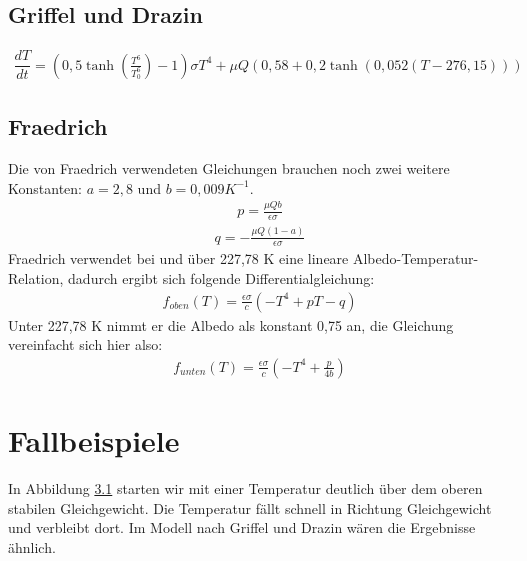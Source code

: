 \documentclass[]{report}
\begin{document}
\section{Griffel und Drazin}
	\begin{align}
		\dfrac{dT}{dt} = (0,5 \tanh\left(\frac{T^6}{T_0^6}\right)-1) \sigma T^4 + \mu Q (0,58 + 0,2 \tanh (0,052 (T - 276,15)))
	\end{align}
\section{Fraedrich}

Die von Fraedrich verwendeten Gleichungen brauchen noch zwei weitere Konstanten: $a=2,8$ und $b=0,009 K^{-1}$.
	\begin{align}
		p=\frac{\mu Q b}{\epsilon \sigma}
	\end{align}
	\begin{align}
		q = - \frac{\mu Q (1-a)}{\epsilon \sigma}
	\end{align}
	Fraedrich verwendet bei und über 227,78 K eine lineare Albedo-Temperatur-Relation, dadurch ergibt sich folgende Differentialgleichung:
	\begin{align}
		f_{oben}(T) = \frac{\epsilon \sigma}{c} (-T^4 + p T - q)
	\end{align}
	Unter 227,78 K nimmt er die Albedo als konstant 0,75 an, die Gleichung vereinfacht sich hier also:
	\begin{align}
		f_{unten}(T) = \frac{\epsilon \sigma}{c} (-T^4 + \frac{p}{4b})
	\end{align}
	

\chapter{Fallbeispiele}

\begin{figure}[h!] \centering \def\svgwidth{\columnwidth}  \caption{} \label{fr320} \end{figure}

In Abbildung \ref{fr320} starten wir mit einer Temperatur deutlich über dem oberen stabilen Gleichgewicht. Die Temperatur fällt schnell in Richtung Gleichgewicht und verbleibt dort. Im Modell nach Griffel und Drazin wären die Ergebnisse ähnlich.
\end{document}
